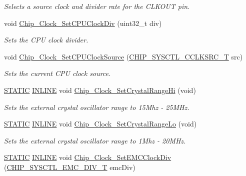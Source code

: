 \begin{DoxyCompactItemize}
\begin{DoxyCompactList}\small\item\em Selects a source clock and divider rate for the C\+L\+K\+O\+UT pin. \end{DoxyCompactList}\item 
void \hyperlink{group__CLOCK__17XX__40XX_gaf88a9722800b98c3ea3cccb572c54230}{Chip\+\_\+\+Clock\+\_\+\+Set\+C\+P\+U\+Clock\+Div} (uint32\+\_\+t div)
\begin{DoxyCompactList}\small\item\em Sets the C\+PU clock divider. \end{DoxyCompactList}\item 
void \hyperlink{group__CLOCK__17XX__40XX_gaefeafe3f6ad6d2690c252e6cfcc826dd}{Chip\+\_\+\+Clock\+\_\+\+Set\+C\+P\+U\+Clock\+Source} (\hyperlink{group__CLOCK__17XX__40XX_ga983f42d70f3939d1f1b46673e9e1f838}{C\+H\+I\+P\+\_\+\+S\+Y\+S\+C\+T\+L\+\_\+\+C\+C\+L\+K\+S\+R\+C\+\_\+T} src)
\begin{DoxyCompactList}\small\item\em Sets the current C\+PU clock source. \end{DoxyCompactList}\item 
\hyperlink{group__LPC__Types__Public__Macros_ga10b2d890d871e1489bb02b7e70d9bdfb}{S\+T\+A\+T\+IC} \hyperlink{group__LPC__Types__Public__Types_ga2eb6f9e0395b47b8d5e3eeae4fe0c116}{I\+N\+L\+I\+NE} void \hyperlink{group__CLOCK__17XX__40XX_ga6887346857de2ee7ec4d0cbc0b8d8396}{Chip\+\_\+\+Clock\+\_\+\+Set\+Crystal\+Range\+Hi} (void)
\begin{DoxyCompactList}\small\item\em Sets the external crystal oscillator range to 15\+Mhz -\/ 25\+M\+Hz. \end{DoxyCompactList}\item 
\hyperlink{group__LPC__Types__Public__Macros_ga10b2d890d871e1489bb02b7e70d9bdfb}{S\+T\+A\+T\+IC} \hyperlink{group__LPC__Types__Public__Types_ga2eb6f9e0395b47b8d5e3eeae4fe0c116}{I\+N\+L\+I\+NE} void \hyperlink{group__CLOCK__17XX__40XX_ga9d93c4a5c3330839f8813d7d5bb55fd8}{Chip\+\_\+\+Clock\+\_\+\+Set\+Crystal\+Range\+Lo} (void)
\begin{DoxyCompactList}\small\item\em Sets the external crystal oscillator range to 1\+Mhz -\/ 20\+M\+Hz. \end{DoxyCompactList}\item 
\hyperlink{group__LPC__Types__Public__Macros_ga10b2d890d871e1489bb02b7e70d9bdfb}{S\+T\+A\+T\+IC} \hyperlink{group__LPC__Types__Public__Types_ga2eb6f9e0395b47b8d5e3eeae4fe0c116}{I\+N\+L\+I\+NE} void \hyperlink{group__CLOCK__17XX__40XX_ga0bcc4845f3e483266e97a414d514e51c}{Chip\+\_\+\+Clock\+\_\+\+Set\+E\+M\+C\+Clock\+Div} (\hyperlink{group__CLOCK__17XX__40XX_ga5c0927d2ce01f4ed4d10d76e44a4773e}{C\+H\+I\+P\+\_\+\+S\+Y\+S\+C\+T\+L\+\_\+\+E\+M\+C\+\_\+\+D\+I\+V\+\_\+T} emc\+Div)

\end{DoxyCompactItemize}
